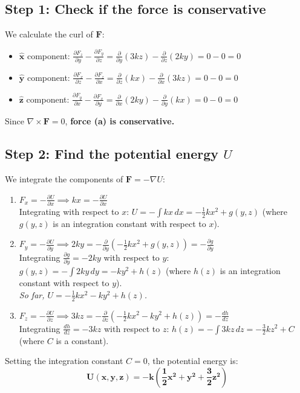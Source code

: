 \documentclass[11pt, a4paper]{article} %
\begin{document}
\subsection*{Step 1: Check if the force is conservative}
We calculate the curl of $\mathbf{F}$:
\begin{itemize}
    \item $\hat{\mathbf{x}}$ component: $\frac{\partial F_z}{\partial y} - \frac{\partial F_y}{\partial z} = \frac{\partial}{\partial y}(3kz) - \frac{\partial}{\partial z}(2ky) = 0 - 0 = 0$
    \item $\hat{\mathbf{y}}$ component: $\frac{\partial F_x}{\partial z} - \frac{\partial F_z}{\partial x} = \frac{\partial}{\partial z}(kx) - \frac{\partial}{\partial x}(3kz) = 0 - 0 = 0$
    \item $\hat{\mathbf{z}}$ component: $\frac{\partial F_y}{\partial x} - \frac{\partial F_x}{\partial y} = \frac{\partial}{\partial x}(2ky) - \frac{\partial}{\partial y}(kx) = 0 - 0 = 0$
\end{itemize}
Since $\nabla \times \mathbf{F} = 0$, \textbf{force (a) is conservative.}

\subsection*{Step 2: Find the potential energy $U$}
We integrate the components of $\mathbf{F} = -\nabla U$:
\begin{enumerate}
    \item $F_x = -\frac{\partial U}{\partial x} \implies kx = -\frac{\partial U}{\partial x}$ \\
    Integrating with respect to $x$:
    $U = -\int kx \, dx = -\frac{1}{2}kx^2 + g(y, z)$ (where $g(y, z)$ is an integration constant with respect to $x$).

    \item $F_y = -\frac{\partial U}{\partial y} \implies 2ky = -\frac{\partial}{\partial y}\left(-\frac{1}{2}kx^2 + g(y, z)\right) = -\frac{\partial g}{\partial y}$ \\
    Integrating $\frac{\partial g}{\partial y} = -2ky$ with respect to $y$:
    $g(y, z) = -\int 2ky \, dy = -ky^2 + h(z)$ (where $h(z)$ is an integration constant with respect to $y$). \\
    \emph{So far, $U = -\frac{1}{2}kx^2 - ky^2 + h(z)$.}

    \item $F_z = -\frac{\partial U}{\partial z} \implies 3kz = -\frac{\partial}{\partial z}\left(-\frac{1}{2}kx^2 - ky^2 + h(z)\right) = -\frac{dh}{dz}$ \\
    Integrating $\frac{dh}{dz} = -3kz$ with respect to $z$:
    $h(z) = -\int 3kz \, dz = -\frac{3}{2}kz^2 + C$ (where $C$ is a constant).
\end{enumerate}
Setting the integration constant $C=0$, the potential energy is:
$$\boldsymbol{U(x, y, z) = -k\left(\frac{1}{2}x^2 + y^2 + \frac{3}{2}z^2\right)}$$
\end{document}
